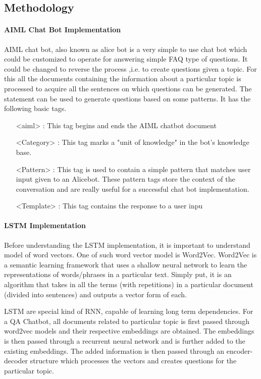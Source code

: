 \subsection{Methodology}
\paragraph{AIML Chat Bot Implementation}
AIML chat bot, also known as alice bot is a very simple to use chat bot which
could be customized to operate for answering simple FAQ type of questions. It
could be changed to reverse the process ,i.e. to create questions given a topic.
For this all the documents containing the information about a particular topic
is processed to acquire all the sentences on which questions can be generated.
The statement can be used to generate questions based on some patterns. It has
the following basic tags.

\begin{itemize}[align=left]
	\item [<aiml>]: This tag begins and ends the AIML chatbot document

	\item [<Category>]: This tag marks a "unit of knowledge" in the bot’s knowledge base.

	\item [<Pattern>]: This tag is used to contain a simple pattern that matches user input
given to an Alicebot. These pattern tags store the context of the conversation
and are really useful for a successful chat bot implementation.

	\item [<Template>]: This tag contains the response to a user inpu

\end{itemize}

\paragraph{LSTM Implementation}

Before understanding the LSTM implementation, it is important to understand
model of word vectors. One of such word vector model is Word2Vec. Word2Vec is a
semantic learning framework that uses a shallow neural network to learn the
representations of words/phrases in a particular text. Simply put, it is an
algorithm that takes in all the terms (with repetitions) in a particular
document (divided into sentences) and outputs a vector form of each.

LSTM are special kind of RNN, capable of learning long term dependencies. For a
QA Chatbot, all documents related to particular topic is first passed through
word2vec models and their respective embeddings are obtained. The embeddings is
then passed through a recurrent neural network and is further added to the
existing embeddings. The added information is then passed through an
encoder-decoder structure which processes the vectors and creates questions for
the particular topic.

